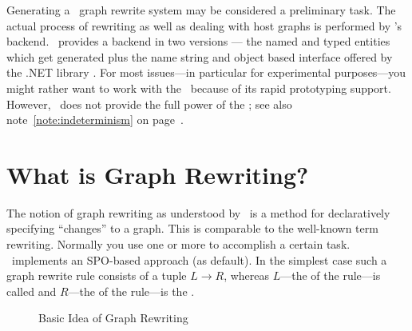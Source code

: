 Generating a \GrG\ graph rewrite system may be considered a preliminary task.
The actual process of rewriting as well as dealing with host graphs is performed by \GrG's backend.
\GrG\ provides a backend  in two versions --- the named and typed entities which get generated plus the name string and object based interface offered by the .NET library \LibGr.
For most issues---in particular for experimental purposes---you might rather want to work with the \GrShell\ because of its rapid prototyping support.
However, \GrShell\ does not provide the full power of the \LibGr; see also note~\ref{note:indeterminism} on page~\pageref{note:indeterminism}.


\section{What is Graph Rewriting?}
\label{ov:whatsallabout}

The notion of graph rewriting as understood by \GrG\ is a method for declaratively specifying ``changes'' to a graph.
This is comparable to the well-known term rewriting. 
Normally you use one or more  to accomplish a certain task.
\GrG\ implements an SPO-based approach (as default).
In the simplest case such a graph rewrite rule consists of a tuple $L \rightarrow R$, whereas $L$---the  of the rule---is called  and $R$---the  of the rule---is the .

\begin{figure}[htbp]
	\centering
  \caption{Basic Idea of Graph Rewriting}
  \label{figrule}
\end{figure}

